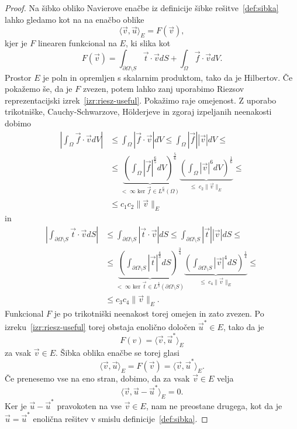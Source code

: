 \documentclass[12pt,a4paper,twoside]{article}
\theoremstyle{definition} %
\theoremstyle{plain} %
\numberwithin{equation}{section}
\newcommand{\vv}{\vec{v}}
\newcommand{\vt}{\vec{t}}
\newcommand{\vu}{\vec{u}}
\newcommand{\vf}{\vec{f}}
\begin{document}
\begin{proof}
Na šibko obliko Navierove enačbe iz definicije šibke rešitve~\ref{def:sibka}
lahko gledamo kot na na enačbo oblike
\[
  \langle \vv, \vu \rangle_E = F(\vv),
\]
kjer je $F$ linearen funkcional na $E$, ki slika kot
\[
  F(\vv) = \int_{\partial \Omega\setminus S} \vt\cdot \vv dS +
  \int_{\Omega} \vf\cdot \vv dV.
\]
Prostor $E$ je poln in opremljen s skalarnim produktom, tako da je Hilbertov.
Če pokažemo še, da je $F$ zvezen, potem lahko zanj uporabimo Riezsov
reprezentacijski izrek~\ref{izr:riesz-useful}. Pokažimo raje omejenost. Z
uporabo trikotniške, Cauchy-Schwarzove, H\"olderjeve in zgoraj izpeljanih
neenakosti dobimo
\begin{align*}
  \left| \int_\Omega \vf \cdot \vv dV \right| &\leq
  \int_\Omega \left|\vf \cdot \vv \right| dV \leq
  \int_\Omega |\vf| |\vv| dV \leq \\
  &\leq \underbrace{\left(\int_\Omega |\vf|^\frac65 dV \right)^\frac56}_{<\;\infty
    \text{ ker }\vf \in L^\frac65(\Omega)} \underbrace{\left( \int_\Omega
    |\vv|^6dV\right)^\frac16}_{\leq \; c_2 \|\vv\|_E} \leq \\
    &\leq c_1 c_2 \|\vv\|_E
\end{align*}
in
\begin{align*}
  \left| \int_{\partial \Omega \setminus S} \vt \cdot \vv dS \right| &\leq
  \int_{\partial \Omega \setminus S} \left|\vt \cdot \vv \right| dS \leq
  \int_{\partial \Omega \setminus S} |\vt| |\vv| dS \leq \\
  &\leq \underbrace{\left(\int_{\partial \Omega \setminus S} |\vt|^\frac43 dS \right)^\frac34}_{<\;\infty
    \text{ ker }\vt \in L^\frac43({\partial \Omega \setminus S})} \underbrace{\left( \int_{\partial \Omega \setminus S}
    |\vv|^4dS\right)^\frac14}_{\leq \; c_4 \|\vv\|_E} \leq \\
    &\leq c_3 c_4 \|\vv\|_E.
\end{align*}
Funkcional $F$ je po trikotniški neenakost torej omejen in zato zvezen. Po
izreku~\ref{izr:riesz-useful} torej obstaja enolično določen $\vu^\ast \in E$,
tako da je
\[ F(v) = \langle \vv, \vu^\ast \rangle_E \]
za vsak $\vv \in E$. Šibka oblika enačbe se torej glasi
\[
  \langle \vv, \vu \rangle_E = F(\vv) = \langle \vv, \vu^\ast \rangle_E.
\]
Če prenesemo vse na eno stran, dobimo, da za vsak $\vv \in E$ velja
\[
  \langle \vv, \vu - \vu^\ast \rangle_E = 0.
\]
Ker je $\vu-\vu^\ast$ pravokoten na vse $\vv \in E$, nam ne preostane drugega,
kot da je $\vu = \vu^\ast$ enolična rešitev v smislu definicije~\ref{def:sibka}.
\end{proof}
\end{document}
